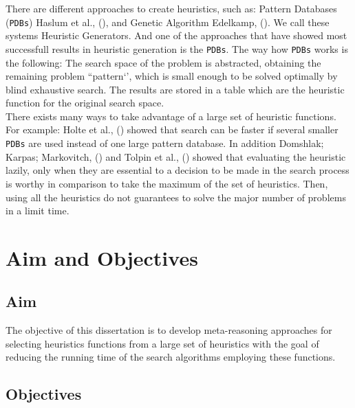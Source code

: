 There are different approaches to create heuristics, such as: Pattern Databases (\texttt{PDBs}) Haslum et al., (\citeyear{haslum2007domain}), and Genetic Algorithm Edelkamp,  (\citeyear{edelkamp2007automated}). We call these systems Heuristic Generators. And one of the approaches that have showed most successfull results in heuristic generation is the \texttt{PDBs}. The way how \texttt{PDBs} works is the following: The search space of the problem is abstracted, obtaining the remaining problem ``pattern‘’, which is small enough to be solved optimally by blind exhaustive search. The results are stored in a table which are the heuristic function for the original search space.\\

There exists many ways to take advantage of a large set of heuristic functions. For example: Holte et al., (\citeyear{holte2006maximizing}) showed that search can be faster if several smaller \texttt{PDBs} are used instead of one large pattern database. In addition Domshlak; Karpas; Markovitch, (\citeyear{domshlak2010max}) and Tolpin et al.,  (\citeyear{tolpin2013towards}) showed that evaluating the heuristic lazily, only when they are essential to a decision to be made in the search process is worthy in comparison to take the maximum of the set of heuristics. Then, using all the heuristics do not guarantees to solve the major number of problems in a limit time.
\section{Aim and Objectives}
\subsection{Aim}
\noindent
The objective of this dissertation is to develop meta-reasoning approaches for selecting heuristics functions from a large set of heuristics with the goal of reducing the running time of the search algorithms employing these functions.

\subsection{Objectives}
\noindent

